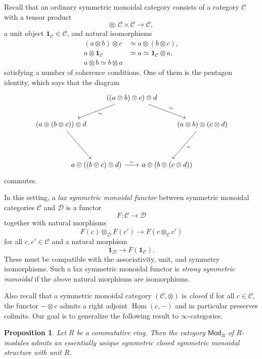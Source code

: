\documentclass[10pt]{amsart}
\newtheorem{prop}[thm]{Proposition}
\theoremstyle{definition}
\theoremstyle{remark}
\theoremstyle{plain}
\theoremstyle{definition}
\theoremstyle{remark}
\newcommand{\mc}[1]{\mathcal{#1}}
\newcommand{\ms}[1]{\mathsf{#1}}
\newcommand{\ul}[1]{\underline{#1}}
\newcommand{\1}{\mathbf{1}}
\newcommand{\2}{\mathbf{2}}
\newcommand{\3}{\mathbf{3}}
\DeclareMathOperator{\Hom}{Hom}
\begin{document}
Recall that an ordinary symmetric monoidal category consists of a category $\mc{C}$ with a tensor product
\[ \otimes \colon \mc{C} \times \mc{C} \to \mc{C}, \]
a unit object $\1_{\mc{C}} \in \mc{C}$, and natural isomorphisms
\begin{align*}
    (a \otimes b) \otimes c &\simeq a \otimes (b \otimes c), \\
    a \otimes \1_{\mc{C}} &\simeq a \simeq \1_{\mc{C}} \otimes a, \\
    a \otimes b \simeq b \otimes a
\end{align*}
satisfying a number of coherence conditions. One of them is the pentagon identity, which says that the diagram
\begin{equation*}
\begin{tikzcd}[column sep=-3em, row sep=2em]
    & & ((a \otimes b) \otimes c) \otimes d \ar{drr}{\sim} \ar{dll}{\sim} & & \\
    (a \otimes (b \otimes c)) \otimes d \ar{ddr} & & & & (a \otimes b) \otimes (c \otimes d) \ar{ddl}{\sim} \\
    \\
    & a \otimes ((b \otimes c) \otimes d) \ar{rr}{\sim} & & a \otimes (b \otimes (c \otimes d))
\end{tikzcd}
\end{equation*}
commutes. 

In this setting, a \textit{lax symmetric monoidal functor} between symmetric monoidal categories $\mc{C}$ and $\mc{D}$ is a functor 
\[ F \colon \mc{C} \to \mc{D} \]
together with natural morphisms
\[ F(c) \otimes_{\mc{D}} F(c') \to F(c \otimes_{\mc{C}} c') \]
for all $c, c' \in \mc{C}$ and a natural morphism
\[ \1_{\mc{D}} \to F(\1_{\mc{C}}). \]
These must be compatible with the associativity, unit, and symmetry isomorphisms. Such a lax symmetric monoidal functor is \textit{strong symmetric monoidal} if the above natural morphisms are isomorphisms.

Also recall that a symmetric monoidal category $(\mc{C}, \otimes)$ is \textit{closed} if for all $c\in \mc{C}$, the functor $- \otimes c$ admits a right adjoint $\ul{\Hom}(c, -)$ and in particular preserves colimits. Our goal is to generalize the following result to $\infty$-categories.

\begin{prop}
    Let $R$ be a commutative ring. Then the category $\ms{Mod}_R$ of $R$-modules admits an essentially unique symmetric closed symmetric monoidal structure with unit $R$.
\end{prop}
\end{document}
